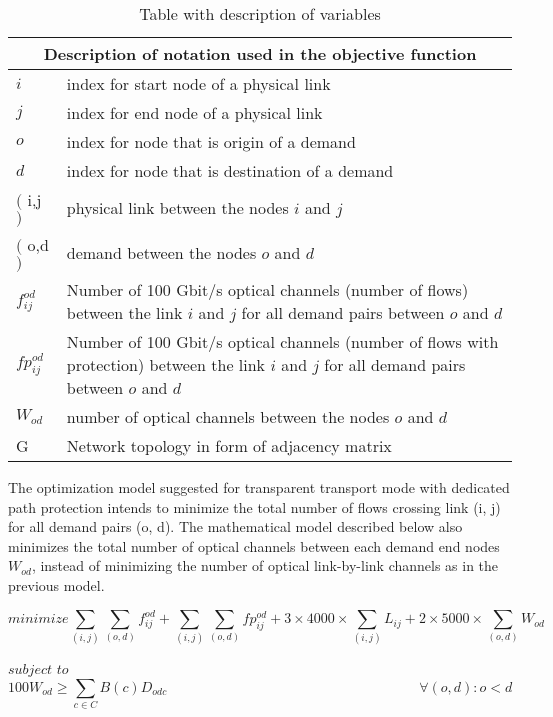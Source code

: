 \begin{table}[h!]
\centering
\begin{tabular}{ |p{1cm}||p{13cm}|}
 \hline
 \multicolumn{2}{|c|}{Description of notation used in the objective function} \\
 \hline
 \hline
 $i$ & index for start node of a physical link \\
 $j$ & index for end node of a physical link \\
 $o$ & index for node that is origin of a demand \\
 $d$ & index for node that is destination of a demand \\
 $($ i,j $)$ & physical link between the nodes $i$ and $j$ \\
 $($ o,d $)$ & demand between the nodes $o$ and $d$ \\
 $f_{ij}^{od}$ & Number of 100 Gbit/s optical channels (number of flows) between the link $i$ and $j$ for all demand pairs between $o$ and $d$ \\
 $fp_{ij}^{od}$ & Number of 100 Gbit/s optical channels (number of flows with protection) between the link $i$ and $j$ for all demand pairs between $o$ and $d$ \\
 $W_{od}$ & number of optical channels between the nodes $o$ and $d$\\
 G & Network topology in form of adjacency matrix \\
 \hline
\end{tabular}
\caption{Table with description of variables}
\label{description_transp}
\end{table}

The optimization model suggested for transparent transport mode with dedicated path protection intends to minimize the total number of flows crossing link (i, j) for all demand pairs (o, d). The mathematical model described below also minimizes the total number of optical channels between each demand end nodes $W_{od}$, instead of minimizing the number of optical link-by-link channels as in the previous model.

\vspace{10pt}
\begin{equation}
minimize    \sum_{(i,j)} \sum_{(o,d)} f_{ij}^{od} + \sum_{(i,j)} \sum_{(o,d)} fp_{ij}^{od} + 3 \times 4000 \times \sum_{(i,j)} L_{ij} + 2 \times 5000 \times \sum_{(o,d)} W_{od}
\label{ILPTransp}
\end{equation}

$subject$ $to$
\begin{equation}
100 W_{od} \geq \sum_{c\in C} B\left(c\right) D_{odc} \qquad \qquad \qquad \qquad \qquad \qquad \qquad \qquad \qquad
\forall(o,d) : o < d
\label{ILPTransp0}
\end{equation}

